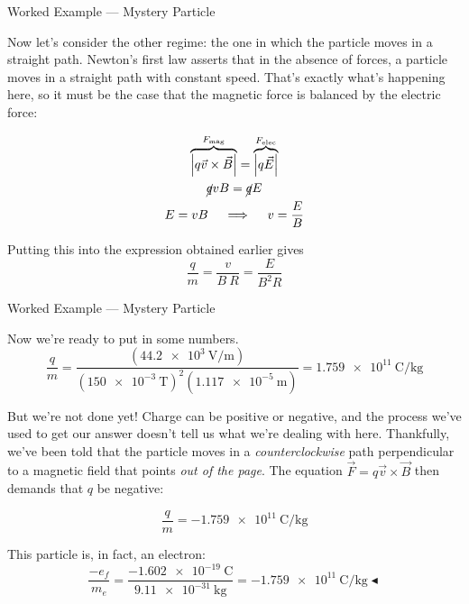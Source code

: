 \documentclass{beamer}
\begin{document}
\begin{frame}{Worked Example --- Mystery Particle}

Now let's consider the other regime: the one in which the particle moves in a straight path. Newton's first law asserts that in the absence of forces, a particle moves in a straight path with constant speed. That's exactly what's happening here, so it must be the case that the magnetic force is balanced by the electric force:

\begin{gather*}
    \overbrace{\left| q\vec{v} \times \vec{B} \right|}^{F_{\text{mag}}} = \overbrace{\left| q \vec{E} \right|}^{F_{\text{elec}}} \\
    \cancel{q} v B = \cancel{q} E \\
    E = v B \quad \implies \quad v = \frac{E}{B}
\end{gather*}

Putting this into the expression obtained earlier gives
\begin{equation*}
    \frac{q}{m} = \frac{v}{B\ R} = \boxed{\frac{E}{B^2 R}}
\end{equation*}

\end{frame}

\begin{frame}{Worked Example --- Mystery Particle}

Now we're ready to put in some numbers.
\begin{equation*}
    \frac{q}{m} = \frac{\left( \SI{44.2e3}{\volt/\metre} \right)}{\left( \SI{150e-3}{\tesla} \right)^2 \left( \SI{1.117e-5}{\metre} \right)} =  \SI{1.759e11}{\coulomb/\kilo\gram}
\end{equation*}

But we're not done yet! Charge can be positive or negative, and the process we've used to get our answer doesn't tell us what we're dealing with here. Thankfully, we've been told that the particle moves in a \emph{counterclockwise} path perpendicular to a magnetic field that points \emph{out of the page}. The equation $\vec{F} = q\vec{v} \times \vec{B}$ then demands that $q$ be negative:

\begin{equation*}
    \boxed{\frac{q}{m} = \SI{-1.759e11}{\coulomb/\kilo\gram}}
\end{equation*}

This particle is, in fact, an electron:
\begin{equation*}
    \frac{-e_f}{m_e} = \frac{\SI{-1.602e-19}{\coulomb}}{\SI{9.11e-31}{\kilo\gram}} = \SI{-1.759e11}{\coulomb/\kilo\gram} \blacktriangleleft
\end{equation*}

\end{frame}
\end{document}
